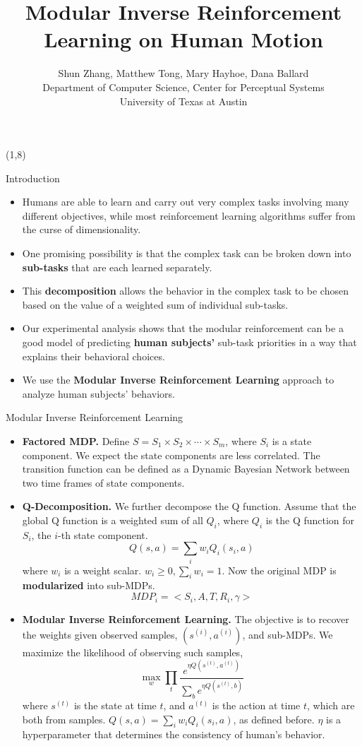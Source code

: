 \documentclass[final]{beamer}
\title{Modular Inverse Reinforcement Learning on Human Motion}
\author{Shun Zhang, Matthew Tong, Mary Hayhoe, Dana Ballard\\
Department of Computer Science, Center for Perceptual Systems\\
University of Texas at Austin}
\begin{document}
\begin{frame}{} 

\begin{textblock}{35}(1,8)
\begin{block}{Introduction}
\begin{itemize}
\item
Humans are able to learn and carry out very complex tasks involving 
many different objectives, while most reinforcement learning algorithms suffer
from the curse of dimensionality.
\item
One promising possibility is that the complex task can be broken down into 
{\bf sub-tasks} that are each learned separately.
\item
This {\bf decomposition} allows the behavior in the complex task to be chosen based on
the value of a weighted sum of individual sub-tasks.
\item
Our experimental analysis shows that the modular reinforcement can be a 
good model of predicting {\bf human subjects'} sub-task priorities in a way that
explains their behavioral choices.
\item
We use the {\bf Modular Inverse Reinforcement Learning} approach to analyze
human subjects' behaviors.
\end{itemize}
\end{block}

\begin{block}{Modular Inverse Reinforcement Learning}
\begin{itemize}
\item {\bf Factored MDP.}
Define $S = S_1 \times S_2 \times \cdots \times S_m$, where $S_i$ is a state
component. We expect the state components are less correlated. The transition
function can be defined as a Dynamic Bayesian Network between two time frames of
state components.
\item {\bf Q-Decomposition.}
We further decompose the Q function.
Assume that the global Q function is a weighted sum of all $Q_i$, where $Q_i$ is
the Q function for $S_i$, the $i$-th state component.
$$Q(s, a) = \sum_i w_i Q_i (s_i, a)$$
where $w_i$ is a weight scalar. $w_i \geq 0, \sum_i w_i = 1$.
Now the original MDP is {\bf modularized} into sub-MDPs.
$$MDP_i = <S_i, A, T, R_i, \gamma>$$
\item {\bf Modular Inverse Reinforcement Learning.}
The objective is to recover the weights given observed samples, $(s^{(i)},
a^{(i)})$, and sub-MDPs.  We maximize the likelihood of observing such samples,
$$\max_w \prod_t \frac{e^{\eta Q(s^{(t)}, a^{(t)})}}{\sum_b e^{\eta Q(s^{(t)},
b)}}$$
where $s^{(t)}$ is the state at time $t$, and $a^{(t)}$ is the action at time
$t$, which are both from samples. $Q(s, a) = \sum_i w_i Q_i(s_i, a)$, as defined
before. $\eta$ is a hyperparameter that determines the consistency of human's
behavior.
\end{itemize}
\end{block}
\end{textblock}


\end{frame}
\end{document}
